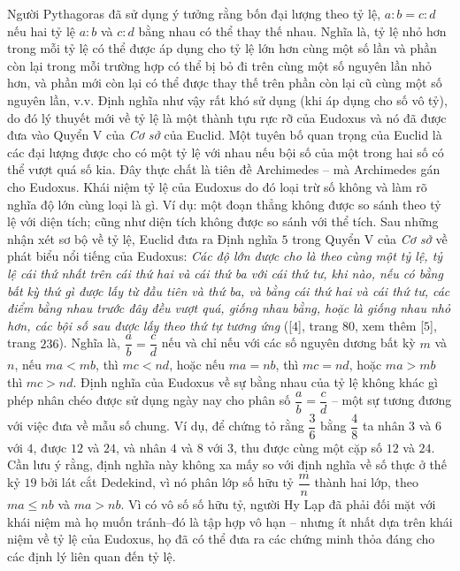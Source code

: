 \begin{multicols}{2}
	\vskip 0.1cm
	Người Pythagoras đã sử dụng ý tưởng rằng bốn đại lượng theo tỷ lệ, $a:b = c : d$  nếu hai tỷ lệ $a:b$  và $c:d$ bằng nhau có thể thay thế nhau. Nghĩa là, tỷ lệ nhỏ hơn trong mỗi tỷ lệ có thể được áp dụng cho tỷ lệ lớn hơn cùng một số lần và phần còn lại trong mỗi trường hợp có thể bị bỏ đi trên cùng một số nguyên lần nhỏ hơn, và phần mới còn lại có thể được thay thế trên phần còn lại cũ cùng một số nguyên lần, v.v. 
	\vskip 0.1cm
	Định nghĩa như vậy rất khó sử dụng (khi áp dụng cho số vô tỷ), do đó lý thuyết mới về tỷ lệ là một thành tựu rực rỡ của Eudoxus và nó đã được đưa vào Quyển V của \textit{Cơ sở} của Euclid.
	\vskip 0.1cm
	Một tuyên bố quan trọng của Euclid là các đại lượng được cho có một tỷ lệ với nhau nếu bội số của một trong hai số có thể vượt quá số kia. 
	\vskip 0.1cm
	Đây thực chất là tiên đề Archimedes -- mà Archimedes gán cho Eudoxus. Khái niệm tỷ lệ của Eudoxus do đó loại trừ số không và làm rõ nghĩa độ lớn cùng loại là gì. Ví dụ: một đoạn thẳng không được so sánh theo tỷ lệ với diện tích; cũng như diện tích không được so sánh với thể tích.
	\vskip 0.1cm
	Sau những nhận xét sơ bộ về tỷ lệ, Euclid đưa ra Định nghĩa $5$ trong Quyển V của \textit{Cơ sở} về phát biểu nổi tiếng của Eudoxus: \textit{Các độ lớn được cho là theo cùng một tỷ lệ, tỷ lệ cái thứ nhất trên cái thứ hai và cái thứ ba với cái thứ tư, khi nào, nếu có bằng bất kỳ thứ gì được lấy từ đầu tiên và thứ ba, và bằng cái thứ hai và cái thứ tư, các điểm bằng nhau trước đây đều vượt quá, giống nhau bằng, hoặc là giống nhau nhỏ hơn, các bội số sau được lấy theo thứ tự tương ứng} ([$4$], trang $80$, xem thêm [$5$], trang $236$).
	\vskip 0.1cm
	Nghĩa là, $\dfrac{a}{b} = \dfrac{c}{d}$  nếu và chỉ nếu với các số nguyên dương bất kỳ $m$  và $n$,  nếu $ma < mb$,  thì $mc < nd$,  hoặc nếu $ma = nb$,  thì $mc = nd$,  hoặc $ma > mb$  thì $mc > nd$. 
	\vskip 0.1cm
	Định nghĩa của Eudoxus về sự bằng nhau của tỷ lệ không khác gì phép nhân chéo được sử dụng ngày nay cho phân số $\dfrac{a}{b} = \dfrac{c}{d}$  -- một sự tương đương với việc đưa về mẫu số chung.  Ví dụ, để chứng tỏ rằng $\dfrac{3}{6}$  bằng $\dfrac{4}{8}$  ta nhân $3$ và $6$ với $4$, được $12$ và $24$, và nhân $4$ và $8$ với $3$, thu được cùng một cặp số $12$ và $24$.
	\vskip 0.1cm 
	Cần lưu ý rằng, định nghĩa này không xa mấy so với định nghĩa về số thực ở thế kỷ $19$ bởi lát cắt Dedekind, vì nó phân lớp số hữu tỷ  $\dfrac{m}{n}$  thành hai lớp, theo $ma \le nb$  và $ma > nb$.
	\vskip 0.1cm 
	Vì có vô số số hữu tỷ, người Hy Lạp đã phải đối mặt với khái niệm mà họ muốn tránh--đó là tập hợp vô hạn -- nhưng ít nhất dựa trên khái niệm về tỷ lệ của Eudoxus, họ đã có thể đưa ra các chứng minh thỏa đáng cho các định lý liên quan đến tỷ lệ.

\end{multicols}

